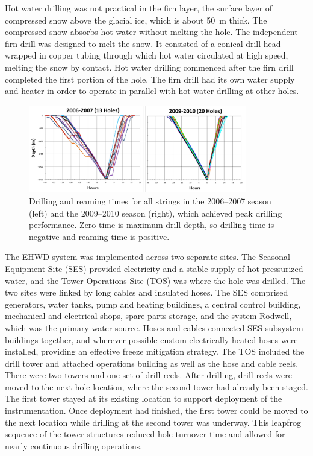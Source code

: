 Hot water drilling was not practical in the firn layer, the surface layer of
compressed snow above the glacial ice, which is about 50~m thick. The
compressed snow absorbs hot water without melting the hole. The independent
firn drill was designed to melt the snow. It consisted of a conical drill
head wrapped in copper tubing through which hot water circulated at high speed,
melting the snow by contact. Hot water drilling commenced after the firn
drill completed the first portion of the hole. The firn drill had its own
water supply and heater in order to operate in parallel with hot water drilling
at other holes.

\begin{figure}[!h]
 \centering
 \includegraphics[width=0.85\textwidth]{graphics/drill/drill_depthvtime.pdf}
\caption{Drilling and reaming times for all strings in the 2006--2007 season
  (left) and the 2009--2010 season (right), which achieved peak drilling
  performance. Zero time is maximum drill depth, so drilling time is
  negative and reaming time is positive.}
\label{fig:drilldepthtime}
\end{figure}

The EHWD system was implemented across two separate sites.  The Seasonal
Equipment Site (SES) provided electricity and a stable supply of hot
pressurized water, and the Tower Operations Site (TOS) was where the hole
was drilled.  The two sites were linked by long cables and insulated
hoses. The SES comprised generators, water tanks, pump and heating
buildings, a central control building, mechanical and electrical shops,
spare parts storage, and the system Rodwell, which was the primary water
source. Hoses and cables connected SES subsystem buildings together, and
wherever possible custom electrically heated hoses were installed,
providing an effective freeze mitigation strategy. The TOS included the
drill tower and attached operations building as well as the hose and cable
reels.  There were two towers and one set of drill reels.  After drilling,
drill reels were moved to the next hole location, where the second tower
had already been staged.  The first tower stayed at its existing location
to support deployment of the instrumentation.  Once deployment had
finished, the first tower could be moved to the next location while
drilling at the second tower was underway.  This leapfrog sequence of the
tower structures reduced hole turnover time and allowed for nearly
continuous drilling operations.

